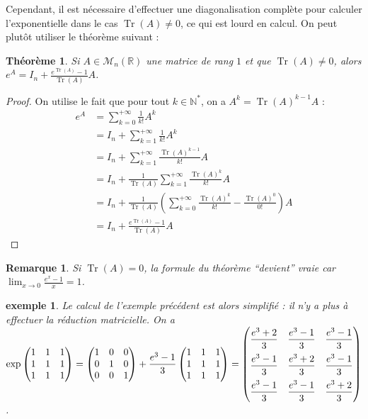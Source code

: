 \documentclass[a4paper]{article}
\newtheorem*{theorem}{Théorème}
\newtheorem*{remark}{Remarque}
\newtheorem*{example}{exemple}
\begin{document}
Cependant, il est nécessaire d'effectuer une diagonalisation complète pour calculer l'exponentielle dans le cas $\operatorname{Tr}(A) \neq 0$, ce qui est lourd en calcul. On peut plutôt utiliser le théorème suivant :

\begin{theorem}
    Si $A \in \mathcal{M}_{n}(\mathbb{R})$ une matrice de rang $1$ et que $\operatorname{Tr}(A) \neq 0$, alors $\displaystyle e^A = I_n + \frac{e^{\operatorname{Tr}(A)}-1}{\operatorname{Tr}(A)}A$.
\end{theorem}

\begin{proof}
    On utilise le fait que pour tout $k \in \mathbb{N}^*$, on a $A^k = \operatorname{Tr}(A)^{k-1}A$ :
    \begin{align*}
        e^A &= \sum_{k=0}^{+\infty} \frac{1}{k!} A^k \\
        &= I_n + \sum_{k=1}^{+\infty} \frac{1}{k!} A^k \\
        &= I_n + \sum_{k=1}^{+\infty} \frac{\operatorname{Tr}(A)^{k-1}}{k!} A\\
        &= I_n + \frac{1}{\operatorname{Tr}(A)}\sum_{k=1}^{+\infty} \frac{\operatorname{Tr}(A)^k}{k!} A \\
        &= I_n + \frac{1}{\operatorname{Tr}(A)} \left(\sum_{k=0}^{+\infty} \frac{\operatorname{Tr}(A)^k}{k!} - \frac{\operatorname{Tr}(A)^0}{0!}\right)A \\
        &= I_n + \frac{e^{\operatorname{Tr}(A)}-1}{\operatorname{Tr}(A)}A
    \end{align*}
\end{proof}

\begin{remark}
    Si $\operatorname{Tr}(A) = 0$, la formule du théorème ``devient'' vraie car $\displaystyle \lim_{x \to 0} \frac{e^x - 1}{x} = 1$.
\end{remark}

\begin{example}
    Le calcul de l'exemple précédent est alors simplifié : il n'y a plus à effectuer la réduction matricielle. On a $\exp\begin{pmatrix} 1 & 1 & 1 \\ 1 & 1 & 1 \\ 1 & 1 & 1 \end{pmatrix} = \begin{pmatrix} 1 & 0 & 0 \\ 0 & 1 & 0 \\ 0 & 0 & 1 \end{pmatrix} + \dfrac{e^3 - 1}{3} \begin{pmatrix} 1 & 1 & 1 \\ 1 & 1 & 1 \\ 1 & 1 & 1 \end{pmatrix} = \setlength{\delimitershortfall}{0pt} \begin{pmatrix} \dfrac{e^3 + 2}{3} & \dfrac{e^3-1}{3} & \dfrac{e^3-1}{3} \\[2ex] \dfrac{e^3-1}{3} & \dfrac{e^3 + 2}{3} & \dfrac{e^3-1}{3} \\[2ex] \dfrac{e^3-1}{3} & \dfrac{e^3-1}{3} & \dfrac{e^3 + 2}{3} \end{pmatrix}$.
\end{example}
\end{document}
